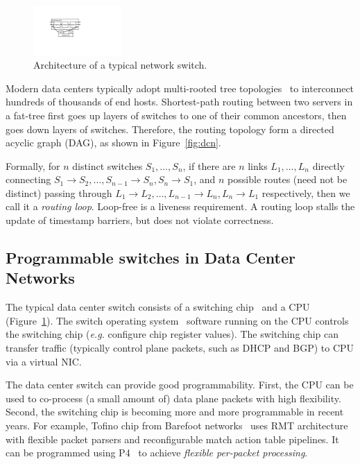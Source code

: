 \begin{figure}[t]
\centering
\includegraphics[width=0.3\textwidth]{images/cropped_switch_architecture.pdf}
\caption{Architecture of a typical network switch.}
\label{fig:switch}
\vspace{-1.5em}
\end{figure}

Modern data centers typically adopt multi-rooted tree topologies~\cite{leiserson1985fat,greenberg2009vl2} to interconnect hundreds of thousands of end hosts.
Shortest-path routing between two servers in a fat-tree first goes up layers of switches to one of their common ancestors, then goes down layers of switches.
Therefore, the routing topology form a directed acyclic graph (DAG), as shown in Figure~\ref{fig:dcn}.

Formally, for $n$ distinct switches $S_1, \ldots, S_n$, if there are $n$ links $L_1, \ldots, L_n$ directly connecting $S_1 \rightarrow S_2, \ldots, S_{n-1} \rightarrow S_n, S_n \rightarrow S_1$, and $n$ possible routes (need not be distinct) passing through $L_1 \rightarrow L_2, \ldots, L_{n-1} \rightarrow L_n, L_n \rightarrow L_1$ respectively, then we call it a \textit{routing loop}.
Loop-free is a liveness requirement.
A routing loop stalls the update of timestamp barriers, but does not violate correctness.

\subsection{Programmable switches in Data Center Networks}
\label{sec:programmable-switches}


The typical data center switch consists of a switching chip~\cite{broadcom} and a CPU (Figure~\ref{fig:switch}).
The switch operating system~\cite{arista-eos} software running on the CPU controls the switching chip (\textit{e.g.} configure chip register values).
The switching chip can transfer traffic (typically control plane packets, such as DHCP and BGP) to CPU via a virtual NIC.

The data center switch can provide good programmability.
First, the CPU can be used to co-process (a small amount of) data plane packets with high flexibility\cite{lu2011serverswitch}.
Second, the switching chip is becoming more and more programmable in recent years.
For example, Tofino chip from Barefoot networks~\cite{tofino} uses RMT architecture~\cite{bosshart2013forwarding} with flexible packet parsers and reconfigurable match action table pipelines.
It can be programmed using P4~\cite{bosshart2014p4} to achieve \textit{flexible per-packet processing}.

